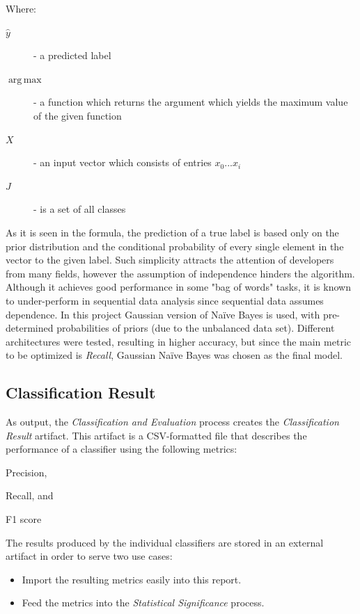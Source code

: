 \documentclass[conference]{sig-alternate-05-2015}
\DeclareMathOperator*{\argmax}{arg\,max}
\begin{document}
\noindent Where:
\begin{description}
  \item[$\hat{y}$] - a predicted label
  \item[$\argmax$] - a function which returns the argument which yields the
  maximum value of the given function
  \item[$X$] - an input vector which consists of entries ${x_0 ... x_i}$
  \item[$J$] - is a set of all classes
\end{description}
\noindent\hrulefill

As it is seen in the formula, the prediction of a true label is based only on
the prior distribution and the conditional probability of every single element
in the vector to the given label. Such simplicity attracts the attention of
developers from many fields, however the assumption of independence hinders the
algorithm. Although it achieves good performance in some "bag of words" tasks,
it is known to under-perform in sequential data analysis since sequential data
assumes dependence. In this project Gaussian version of Na\"ive Bayes is used,
with pre-determined probabilities of priors (due to the unbalanced data set).
Different architectures were tested, resulting in higher accuracy, but since the
main metric to be optimized is \textit{Recall}, Gaussian Na\"ive Bayes was
chosen as the final model.

\subsection{Classification Result}\label{subsec:classification_result}
As output, the \textit{Classification and Evaluation} process creates the
\textit{Classification Result} artifact. This artifact is a CSV-formatted file
that describes the performance of a classifier using the following metrics:
\begin{enumerate*}[(1)]
  \item Precision,
  \item Recall, and
  \item F1 score
\end{enumerate*}

The results produced by the individual classifiers are stored in an external
artifact in order to serve two use cases:

\begin{itemize}
  \item Import the resulting metrics easily into this report.
  \item Feed the metrics into the \textit{Statistical Significance} process.
\end{itemize}
\end{document}
